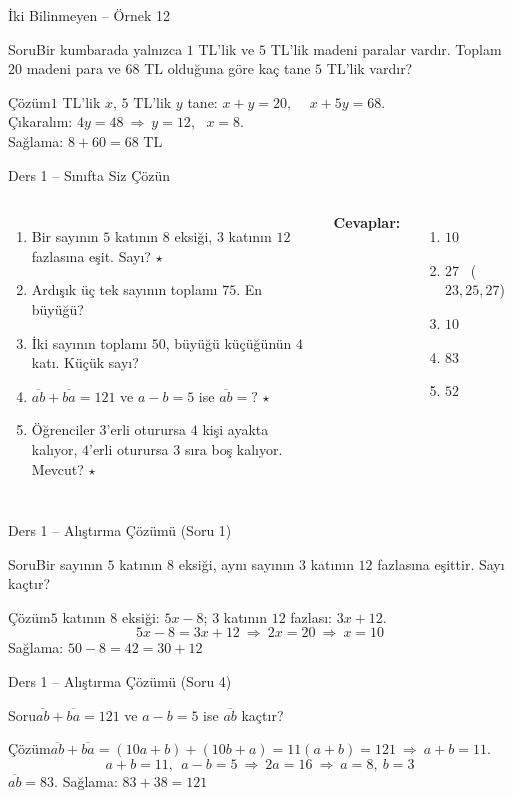 \documentclass[aspectratio=169,11pt,handout]{beamer}
\newcommand{\soru}[3]{%
\begin{frame}{#1}
  \begin{block}{Soru}\large #2\end{block}
  \pause
  \begin{exampleblock}{Çözüm}\large #3\end{exampleblock}
\end{frame}}
\newcommand{\ab}[1]{\overline{#1}}
\begin{document}
\soru{İki Bilinmeyen -- Örnek 12}
{Bir kumbarada yalnızca \(1\) TL'lik ve \(5\) TL'lik madeni paralar vardır. Toplam \(20\) madeni para ve \(68\) TL olduğuna göre kaç tane \(5\) TL'lik vardır?}
{\(1\) TL'lik \(x\), \(5\) TL'lik \(y\) tane: \quad \(x+y=20\), \ \ \(x+5y=68\).\\[3pt]
Çıkaralım: \(4y=48\ \Rightarrow\ y=12\), \ \(x=8\).\\[3pt]
Sağlama: \(8+60=68\) TL \checkmark}

\begin{frame}{Ders 1 -- Sınıfta Siz Çözün}
\begin{columns}[t]
\begin{enumerate}
\item Bir sayının \(5\) katının \(8\) eksiği, \(3\) katının \(12\) fazlasına eşit. Sayı? \(\star\)
\item Ardışık üç tek sayının toplamı \(75\). En büyüğü?
\item İki sayının toplamı \(50\), büyüğü küçüğünün \(4\) katı. Küçük sayı?
\item \(\ab{ab}+\ab{ba}=121\) ve \(a-b=5\) ise \(\ab{ab}=?\) \(\star\)
\item Öğrenciler \(3\)'erli oturursa \(4\) kişi ayakta kalıyor, \(4\)'erli oturursa \(3\) sıra boş kalıyor. Mevcut? \(\star\)
\end{enumerate}
\pause
\textbf{Cevaplar:}
\begin{enumerate}
\item \(10\)
\item \(27\) \ (\(23,25,27\))
\item \(10\)
\item \(83\)
\item \(52\)
\end{enumerate}
\end{columns}
\vspace{4pt}{\footnotesize \(\star\) işaretli soruların adım adım çözümü sonraki slaytlardadır.}
\end{frame}

\soru{Ders 1 -- Alıştırma Çözümü (Soru 1)}
{Bir sayının \(5\) katının \(8\) eksiği, aynı sayının \(3\) katının \(12\) fazlasına eşittir. Sayı kaçtır?}
{\(5\) katının \(8\) eksiği: \(5x-8\); \quad \(3\) katının \(12\) fazlası: \(3x+12\).
\[5x-8=3x+12\ \Rightarrow\ 2x=20\ \Rightarrow\ x=10\]
Sağlama: \(50-8=42=30+12\) \checkmark}

\soru{Ders 1 -- Alıştırma Çözümü (Soru 4)}
{\(\ab{ab}+\ab{ba}=121\) ve \(a-b=5\) ise \(\ab{ab}\) kaçtır?}
{\(\ab{ab}+\ab{ba}=(10a+b)+(10b+a)=11(a+b)=121\ \Rightarrow\ a+b=11\).
\[a+b=11,\ \ a-b=5\ \Rightarrow\ 2a=16\ \Rightarrow\ a=8,\ b=3\]
\(\ab{ab}=83\). \quad Sağlama: \(83+38=121\) \checkmark}
\end{document}
